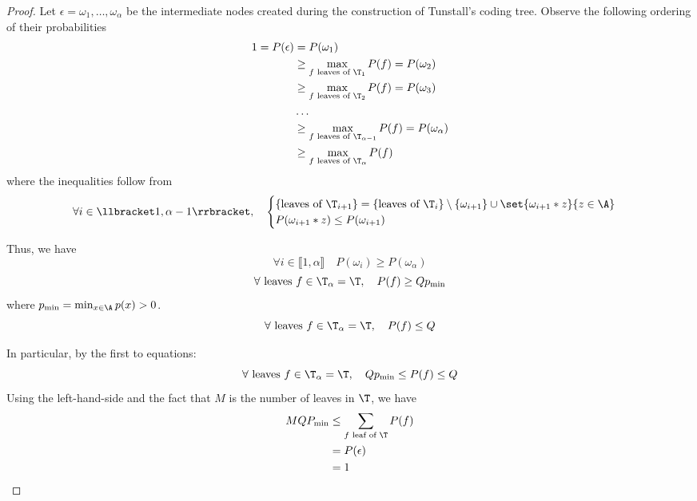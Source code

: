 \documentclass[toc]{../cs-classes/cs-classes}
\begin{document}
\begin{proof}
    Let $\epsilon=\omega_1, \dots, \omega_\alpha$ be the intermediate nodes created during the construction of Tunstall's coding tree. Observe the following ordering of their probabilities
    \begin{equation*}
        \begin{aligned}
            1 = P(\epsilon) &= P(\omega_1)\\
            &\geq \max_{f\textnormal{ leaves of }\T_1}P(f) = P(\omega_2)\\
            &\geq \max_{f\textnormal{ leaves of }\T_2}P(f) = P(\omega_3)\\
            &\dots\\
            &\geq \max_{f\textnormal{ leaves of }\T_{\alpha-1}}P(f) = P(\omega_\alpha)\\
            &\geq \max_{f\textnormal{ leaves of }\T_\alpha}P(f)
        \end{aligned}
    \end{equation*}
    where the inequalities follow from
    \begin{equation*}
        \forall i\in\llbracket1, \alpha-1\rrbracket, \quad \begin{cases}
            \{\textnormal{leaves of }\T_{i+1}\} = \{\textnormal{leaves of }\T_i\} \setminus\{\omega_{i+1}\}\cup\set{\omega_{i+1}*z}{z\in\A}\\
            P(\omega_{i+1}*z)\leq P(\omega_{i+1})
        \end{cases}
    \end{equation*}

    Thus, we have
    \begin{equation*}
        \forall i\in\llbracket1, \alpha\rrbracket \quad P(\omega_i)\geq P(\omega_\alpha)
    \end{equation*}
    \begin{equation*}
        \forall \textnormal{ leaves } f\in\T_\alpha = \T, \quad P(f)\geq Qp_{\min}
    \end{equation*}
    where $p_{\min} = \min_{x\in\A}p(x)>0$.
    \begin{equation*}
        \forall \textnormal{ leaves } f\in\T_\alpha = \T, \quad P(f)\leq Q
    \end{equation*}

    In particular, by the first to equations:
    \begin{equation*}
        \forall \textnormal{ leaves } f\in\T_\alpha = \T, \quad Qp_{\min} \leq P(f) \leq Q
    \end{equation*}
    Using the left-hand-side and the fact that $M$ is the number of leaves in $\T$, we have
    \begin{equation*}
        \begin{aligned}
            MQP_{\min} &\leq \sum_{f \textnormal{ leaf of }\T} P(f)\\
            &= P(\epsilon)\\
            &= 1
        \end{aligned}
    \end{equation*}


\end{proof}
\end{document}
